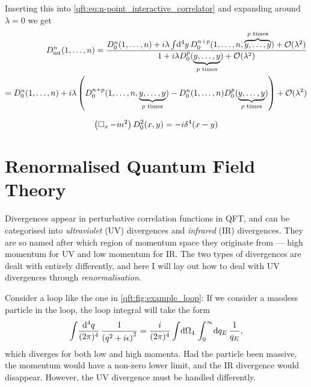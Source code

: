 \documentclass[../main.tex]{subfiles}
\begin{document}
Inserting this into \cref{qft:eq:n-point_interactive_correlator} and expanding around \(\lambda = 0\) we get
\begin{align}
  \nonumber
  D^n_\text{int}(1,\ldots, n) = \frac{D_0^n(1, \ldots, n) + i\lambda \int \!\mathrm{d}^4y\, D_0^{n+p}(1, \ldots, n, \overbrace{y, \ldots, y}^{p\text{ times}}) + \mathcal{O}(\lambda^2)}{1 + i\lambda D_0^p(\underbrace{y, \ldots, y}_{p\text{ times}}) + \mathcal{O}(\lambda^2)} \\
  = D^n_0(1,\ldots,n) + i\lambda \left(D_0^{n+p}(1, \ldots, n, \underbrace{y, \ldots, y}_{p\text{ times}}) - D_0^n(1, \ldots, n) D_0^p(\underbrace{y, \ldots, y}_{p\text{ times}})\right) + \mathcal{O}(\lambda^2)
\end{align}


\begin{equation}
  \left(\operatorname{\Box}_x - m^2\right) D^2_0(x,y) = -i \delta^4(x-y)
\end{equation}





\section{Renormalised Quantum Field Theory}


Divergences appear in perturbative correlation functions in QFT, and can be
categorised into \emph{ultraviolet} (UV) divergences and \emph{infrared} (IR)
divergences. They are so named after which region of momentum space they
originate from --- high momentum for UV and low momentum for IR. The two types
of divergences are dealt with entirely differently, and here I will lay out how
to deal with UV divergences through \emph{renormalisation}. \medskip

Consider a loop like the one in \cref{qft:fig:example_loop}: If we consider a
massless particle in the loop, the loop integral will take the form
\begin{equation}
  \label{qft:eq:example_loop}
  \loopintegral[4]{q} \frac{1}{\pclosed{q^2 + i\epsilon}^2} =
  \frac{i}{(2\pi)^4} \integral{\Omega_4} \integral[_0^\infty]{q_E}
  \frac{1}{q_E},
\end{equation}
which diverges for both low and high momenta.  Had the particle been
massive, the momentum would have a non-zero lower limit, and the IR divergence
would disappear.
However, the UV divergence must be handled differently.
\end{document}
